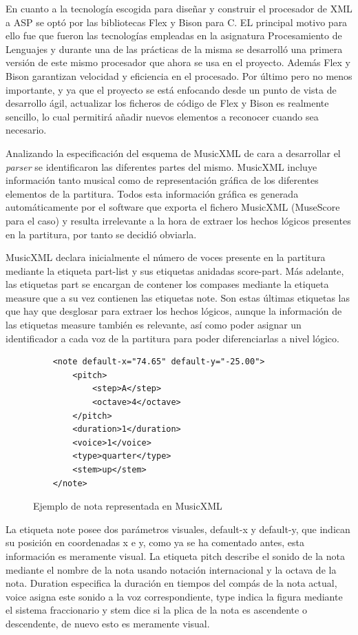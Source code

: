 En cuanto a la tecnología escogida para diseñar y construir el procesador de XML a ASP se optó por las bibliotecas Flex y Bison para C. EL principal motivo para ello fue que fueron las tecnologías empleadas en la asignatura Procesamiento de Lenguajes y durante una de las prácticas de la misma se desarrolló una primera versión de este mismo procesador que ahora se usa en el proyecto. Además Flex y Bison garantizan velocidad y eficiencia en el procesado. Por último pero no menos importante, y ya que el proyecto se está enfocando desde un punto de vista de desarrollo ágil, actualizar los ficheros de código de Flex y Bison es realmente sencillo, lo cual permitirá añadir nuevos elementos a reconocer cuando sea necesario.

Analizando la especificación del esquema de MusicXML de cara a desarrollar el \textit{parser} se identificaron las diferentes partes del mismo. MusicXML incluye información tanto musical como de representación gráfica de los diferentes elementos de la partitura. Todos esta información gráfica es generada automáticamente por el software que exporta el fichero MusicXML (MuseScore para el caso) y resulta irrelevante a la hora de extraer los hechos lógicos presentes en la partitura, por tanto se decidió obviarla. 

MusicXML declara inicialmente el número de voces presente en la partitura mediante la etiqueta part-list y sus etiquetas anidadas score-part. Más adelante, las etiquetas part se encargan de contener los compases mediante la etiqueta measure que a su vez contienen las etiquetas note. Son estas últimas etiquetas las que hay que desglosar para extraer los hechos lógicos, aunque la información de las etiquetas measure también es relevante, así como poder asignar un identificador a cada voz de la partitura para poder diferenciarlas a nivel lógico.

\begin{figure}[h]
	\centering
	\begin{verbatim}
	<note default-x="74.65" default-y="-25.00">
	    <pitch>
	        <step>A</step>
	        <octave>4</octave>
	    </pitch>
	    <duration>1</duration>
	    <voice>1</voice>
	    <type>quarter</type>
	    <stem>up</stem>
	</note>
	\end{verbatim}
	\caption{Ejemplo de nota representada en MusicXML}
	\label{fig:nota_musicxml}
\end{figure}

La etiqueta note posee dos parámetros visuales, default-x y default-y,  que indican su posición en coordenadas x e y, como ya se ha comentado antes, esta información es meramente visual. La etiqueta pitch describe el sonido de la nota mediante el nombre de la nota usando notación internacional y la octava de la nota. Duration especifica la duración en tiempos del compás de la nota actual, voice asigna este sonido a la voz correspondiente, type indica la figura mediante el sistema fraccionario y stem dice si la plica de la nota es ascendente o descendente, de nuevo esto es meramente visual.

